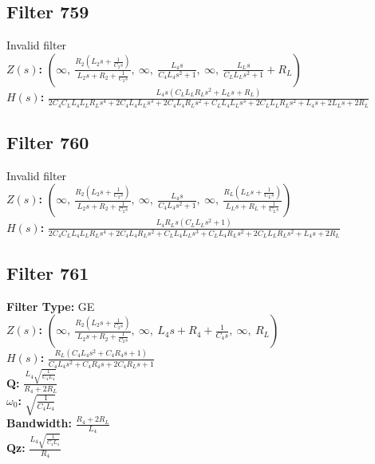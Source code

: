 \documentclass{article}
\begin{document}
\subsection*{Filter 759}
Invalid filter \\ 
\textbf{$Z(s)$:} $\left( \infty, \  \frac{R_{2} \left(L_{2} s + \frac{1}{C_{2} s}\right)}{L_{2} s + R_{2} + \frac{1}{C_{2} s}}, \  \infty, \  \frac{L_{4} s}{C_{4} L_{4} s^{2} + 1}, \  \infty, \  \frac{L_{L} s}{C_{L} L_{L} s^{2} + 1} + R_{L}\right)$ \\ 
\textbf{$H(s)$:} $\frac{L_{4} s \left(C_{L} L_{L} R_{L} s^{2} + L_{L} s + R_{L}\right)}{2 C_{4} C_{L} L_{4} L_{L} R_{L} s^{4} + 2 C_{4} L_{4} L_{L} s^{3} + 2 C_{4} L_{4} R_{L} s^{2} + C_{L} L_{4} L_{L} s^{3} + 2 C_{L} L_{L} R_{L} s^{2} + L_{4} s + 2 L_{L} s + 2 R_{L}}$ \\ 
\subsection*{Filter 760}
Invalid filter \\ 
\textbf{$Z(s)$:} $\left( \infty, \  \frac{R_{2} \left(L_{2} s + \frac{1}{C_{2} s}\right)}{L_{2} s + R_{2} + \frac{1}{C_{2} s}}, \  \infty, \  \frac{L_{4} s}{C_{4} L_{4} s^{2} + 1}, \  \infty, \  \frac{R_{L} \left(L_{L} s + \frac{1}{C_{L} s}\right)}{L_{L} s + R_{L} + \frac{1}{C_{L} s}}\right)$ \\ 
\textbf{$H(s)$:} $\frac{L_{4} R_{L} s \left(C_{L} L_{L} s^{2} + 1\right)}{2 C_{4} C_{L} L_{4} L_{L} R_{L} s^{4} + 2 C_{4} L_{4} R_{L} s^{2} + C_{L} L_{4} L_{L} s^{3} + C_{L} L_{4} R_{L} s^{2} + 2 C_{L} L_{L} R_{L} s^{2} + L_{4} s + 2 R_{L}}$ \\ 
\subsection*{Filter 761}
\textbf{Filter Type:} GE \\ 
\textbf{$Z(s)$:} $\left( \infty, \  \frac{R_{2} \left(L_{2} s + \frac{1}{C_{2} s}\right)}{L_{2} s + R_{2} + \frac{1}{C_{2} s}}, \  \infty, \  L_{4} s + R_{4} + \frac{1}{C_{4} s}, \  \infty, \  R_{L}\right)$ \\ 
\textbf{$H(s)$:} $\frac{R_{L} \left(C_{4} L_{4} s^{2} + C_{4} R_{4} s + 1\right)}{C_{4} L_{4} s^{2} + C_{4} R_{4} s + 2 C_{4} R_{L} s + 1}$ \\ 
\textbf{Q:} $\frac{L_{4} \sqrt{\frac{1}{C_{4} L_{4}}}}{R_{4} + 2 R_{L}}$ \\ 
\textbf{$\omega_0$:} $\sqrt{\frac{1}{C_{4} L_{4}}}$ \\ 
\textbf{Bandwidth:} $\frac{R_{4} + 2 R_{L}}{L_{4}}$ \\ 
\textbf{Qz:} $\frac{L_{4} \sqrt{\frac{1}{C_{4} L_{4}}}}{R_{4}}$ \\ 
\end{document}

